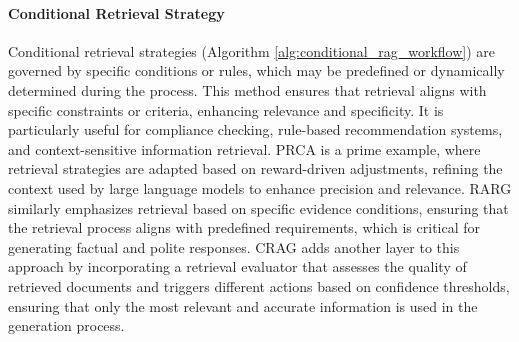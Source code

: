 \paragraph{Conditional Retrieval Strategy} Conditional retrieval strategies (Algorithm \ref{alg:conditional_rag_workflow}) are governed by specific conditions or rules, which may be predefined or dynamically determined during the process. This method ensures that retrieval aligns with specific constraints or criteria, enhancing relevance and specificity. It is particularly useful for compliance checking, rule-based recommendation systems, and context-sensitive information retrieval. PRCA \cite{yang2023prca} is a prime example, where retrieval strategies are adapted based on reward-driven adjustments, refining the context used by large language models to enhance precision and relevance. RARG \cite{yue2024evidencedriven} similarly emphasizes retrieval based on specific evidence conditions, ensuring that the retrieval process aligns with predefined requirements, which is critical for generating factual and polite responses. CRAG \cite{yan2024corrective} adds another layer to this approach by incorporating a retrieval evaluator that assesses the quality of retrieved documents and triggers different actions based on confidence thresholds, ensuring that only the most relevant and accurate information is used in the generation process.

